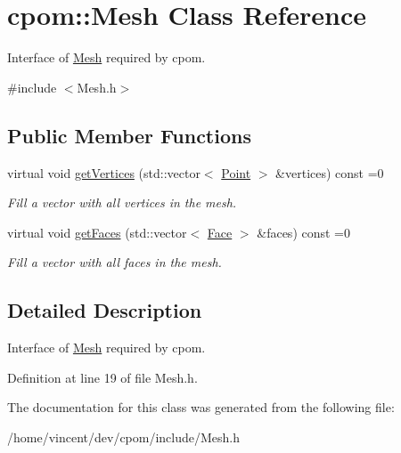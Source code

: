 \hypertarget{classcpom_1_1_mesh}{}\section{cpom\+:\+:Mesh Class Reference}
\label{classcpom_1_1_mesh}


Interface of \hyperlink{classcpom_1_1_mesh}{Mesh} required by cpom.  




{\ttfamily \#include $<$Mesh.\+h$>$}

\subsection*{Public Member Functions}
\begin{DoxyCompactItemize}
\item 
virtual void \hyperlink{classcpom_1_1_mesh_ac091291588f5d563f1d2c3ed93c11924}{get\+Vertices} (std\+::vector$<$ \hyperlink{structcpom_1_1_float3}{Point} $>$ \&vertices) const =0\hypertarget{classcpom_1_1_mesh_ac091291588f5d563f1d2c3ed93c11924}{}\label{classcpom_1_1_mesh_ac091291588f5d563f1d2c3ed93c11924}

\begin{DoxyCompactList}\small\item\em Fill a vector with all vertices in the mesh. \end{DoxyCompactList}\item 
virtual void \hyperlink{classcpom_1_1_mesh_a8ab8a6ac3cc77c21b7a13f8bee198037}{get\+Faces} (std\+::vector$<$ \hyperlink{structcpom_1_1_face}{Face} $>$ \&faces) const =0\hypertarget{classcpom_1_1_mesh_a8ab8a6ac3cc77c21b7a13f8bee198037}{}\label{classcpom_1_1_mesh_a8ab8a6ac3cc77c21b7a13f8bee198037}

\begin{DoxyCompactList}\small\item\em Fill a vector with all faces in the mesh. \end{DoxyCompactList}\end{DoxyCompactItemize}


\subsection{Detailed Description}
Interface of \hyperlink{classcpom_1_1_mesh}{Mesh} required by cpom. 

Definition at line 19 of file Mesh.\+h.



The documentation for this class was generated from the following file\+:\begin{DoxyCompactItemize}
\item 
/home/vincent/dev/cpom/include/Mesh.\+h\end{DoxyCompactItemize}
